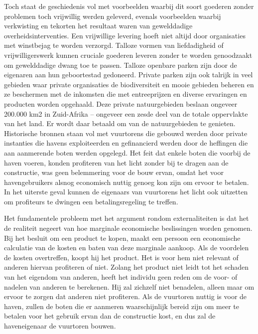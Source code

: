 Toch staat de geschiedenis vol met voorbeelden waarbij dit soort goederen zonder problemen toch vrijwillig werden geleverd, evenals voorbeelden waarbij verkwisting en tekorten het resultaat waren van gewelddadige overheidsinterventies. Een vrijwillige levering hoeft niet altijd door organisaties met winstbejag te worden verzorgd. Talloze vormen van liefdadigheid of vrijwilligerswerk kunnen cruciale goederen leveren zonder te worden genoodzaakt om gewelddadige dwang toe te passen. Talloze openbare parken zijn door de eigenaren aan hun geboortestad gedoneerd. Private parken zijn ook talrijk in veel gebieden waar private organisaties de biodiversiteit en mooie gebieden beheren en ze beschermen met de inkomsten die met entreeprijzen en diverse ervaringen en producten worden opgehaald. Deze private natuurgebieden beslaan ongeveer 200.000 km2 in Zuid-Afrika -- ongeveer een zesde deel van de totale oppervlakte van het land.\autocite{188} Er wordt daar betaald om van de natuurgebieden te genieten. Historische bronnen staan vol met vuurtorens die gebouwd werden door private instanties die havens exploiteerden en gefinancierd werden door de heffingen die aan aanmerende boten werden opgelegd.\autocite{189} Het feit dat enkele boten die voorbij de haven voeren, konden profiteren van het licht zonder bij te dragen aan de constructie, was geen belemmering voor de bouw ervan, omdat het voor havengebruikers alsnog economisch nuttig genoeg kon zijn om ervoor te betalen. In het uiterste geval kunnen de eigenaars van vuurtorens het licht ook uitzetten om profiteurs te dwingen een betalingsregeling te treffen.\autocite{190}

Het fundamentele probleem met het argument rondom externaliteiten is dat het de realiteit negeert van hoe marginale economische beslissingen worden genomen. Bij het besluit om een product te kopen, maakt een persoon een economische calculatie van de kosten en baten van deze marginale aankoop. Als de voordelen de kosten overtreffen, koopt hij het product. Het is voor hem niet relevant of anderen hiervan profiteren of niet. Zolang het product niet leidt tot het schaden van het eigendom van anderen, heeft het individu geen reden om de voor- of nadelen van anderen te berekenen. Hij zal zichzelf niet benadelen, alleen maar om ervoor te zorgen dat anderen niet profiteren. Als de vuurtoren nuttig is voor de haven, zullen de boten die er aanmeren waarschijnlijk bereid zijn om meer te betalen voor het gebruik ervan dan de constructie kost, en dus zal de haveneigenaar de vuurtoren bouwen.

